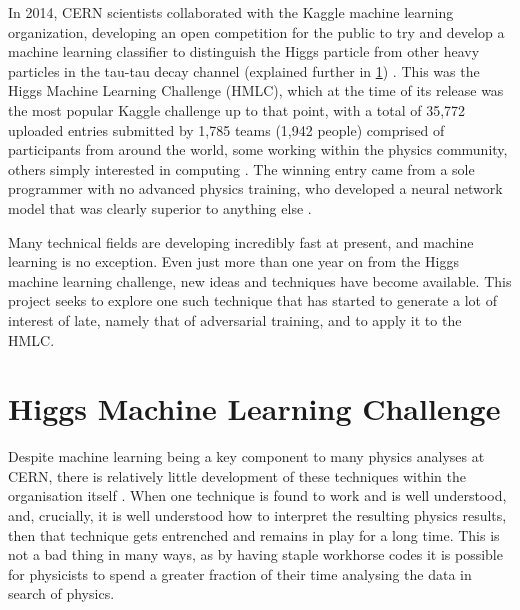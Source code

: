 \documentclass{article} %
\begin{document}
In 2014, CERN scientists collaborated with the Kaggle machine learning organization, developing an open competition for the public to try and develop a machine learning classifier to distinguish the Higgs particle from other heavy particles in the tau-tau decay channel (explained further in \ref{sec:higgs_machine_learning_challenge}) \cite{???}. This was the Higgs Machine Learning Challenge (HMLC), which at the time of its release was the most popular Kaggle challenge up to that point, with a total of 35,772 uploaded entries submitted by 1,785 teams (1,942 people) comprised of participants from around the world, some working within the physics community, others simply interested in computing \cite{Rousseau2015}. The winning entry came from a sole programmer with no advanced physics training, who developed a neural network model that was clearly superior to anything else \cite{???}.


Many technical fields are developing incredibly fast at present, and machine learning is no exception. Even just more than one year on from the Higgs machine learning challenge, new ideas and techniques have become available. This project seeks to explore one such technique that has started to generate a lot of interest of late, namely that of adversarial training, and to apply it to the HMLC.


\section{Higgs Machine Learning Challenge}
\label{sec:higgs_machine_learning_challenge}

Despite machine learning being a key component to many physics analyses at CERN, there is relatively little development of these techniques within the organisation itself \cite{Rousseau2015}. When one technique is found to work and is well understood, and, crucially, it is well understood how to interpret the resulting physics results, then that technique gets entrenched and remains in play for a long time. This is not a bad thing in many ways, as by having staple workhorse codes it is possible for physicists to spend a greater fraction of their time analysing the data in search of physics.
\end{document}
